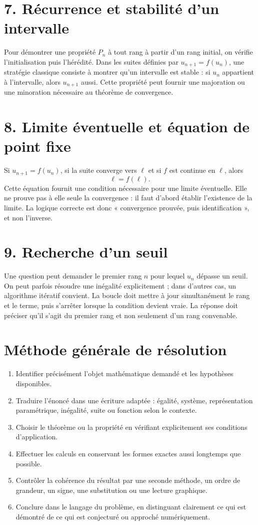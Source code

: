 \section{7. Récurrence et stabilité d’un intervalle}
Pour démontrer une propriété $P_n$ à tout rang à partir d'un rang initial, on vérifie l'initialisation puis l'hérédité. Dans les suites définies par $u_{n+1}=f(u_n)$, une stratégie classique consiste à montrer qu'un intervalle est stable : si $u_n$ appartient à l'intervalle, alors $u_{n+1}$ aussi. Cette propriété peut fournir une majoration ou une minoration nécessaire au théorème de convergence.

\section{8. Limite éventuelle et équation de point fixe}
Si $u_{n+1}=f(u_n)$, si la suite converge vers $\ell$ et si $f$ est continue en $\ell$, alors
\[
\ell=f(\ell).
\]
Cette équation fournit une condition nécessaire pour une limite éventuelle. Elle ne prouve pas à elle seule la convergence : il faut d'abord établir l'existence de la limite. La logique correcte est donc « convergence prouvée, puis identification », et non l'inverse.

\section{9. Recherche d’un seuil}
Une question peut demander le premier rang $n$ pour lequel $u_n$ dépasse un seuil. On peut parfois résoudre une inégalité explicitement ; dans d'autres cas, un algorithme itératif convient. La boucle doit mettre à jour simultanément le rang et le terme, puis s'arrêter lorsque la condition devient vraie. La réponse doit préciser qu'il s'agit du premier rang et non seulement d'un rang convenable.


\section{Méthode générale de résolution}
\begin{methode}
\begin{enumerate}
\item Identifier précisément l'objet mathématique demandé et les hypothèses disponibles.
\item Traduire l'énoncé dans une écriture adaptée : égalité, système, représentation paramétrique, inégalité, suite ou fonction selon le contexte.
\item Choisir le théorème ou la propriété en vérifiant explicitement ses conditions d'application.
\item Effectuer les calculs en conservant les formes exactes aussi longtemps que possible.
\item Contrôler la cohérence du résultat par une seconde méthode, un ordre de grandeur, un signe, une substitution ou une lecture graphique.
\item Conclure dans le langage du problème, en distinguant clairement ce qui est démontré de ce qui est conjecturé ou approché numériquement.
\end{enumerate}
\end{methode}


